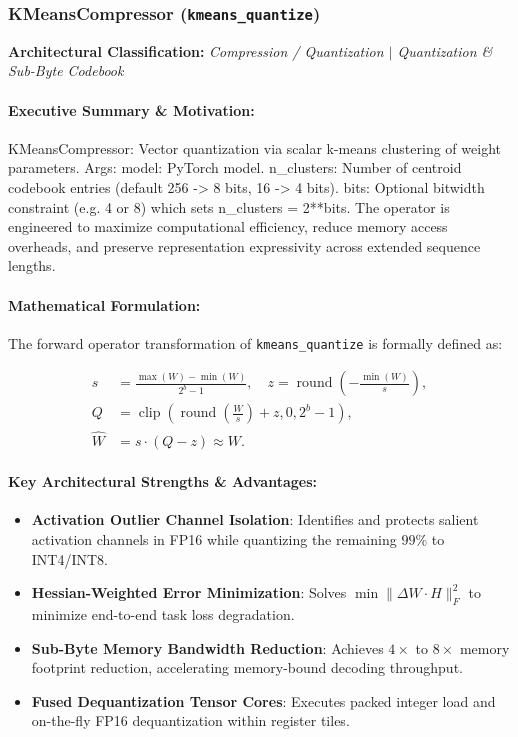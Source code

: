 \subsubsection{KMeansCompressor (\texttt{kmeans\_quantize})}
\label{sec:module_kmeans\_quantize}

\textbf{Architectural Classification:} \textit{Compression / Quantization $\mid$ Quantization & Sub-Byte Codebook}

\paragraph{Executive Summary \& Motivation:}
KMeansCompressor: Vector quantization via scalar k-means clustering of weight parameters.  Args:     model: PyTorch model.     n\_clusters: Number of centroid codebook entries (default 256 -> 8 bits, 16 -> 4 bits).     bits: Optional bitwidth constraint (e.g. 4 or 8) which sets n\_clusters = 2**bits. The operator is engineered to maximize computational efficiency, reduce memory access overheads, and preserve representation expressivity across extended sequence lengths.

\paragraph{Mathematical Formulation:}
The forward operator transformation of \texttt{kmeans\_quantize} is formally defined as:

\begin{align}
s &= \frac{\max(W) - \min(W)}{2^b - 1}, \quad z = \operatorname{round}\left(-\frac{\min(W)}{s}\right), \\
Q &= \operatorname{clip}\left(\operatorname{round}\left(\frac{W}{s}\right) + z, 0, 2^b - 1\right), \\
\hat{W} &= s \cdot (Q - z) \approx W.
\end{align}


\paragraph{Key Architectural Strengths \& Advantages:}
\begin{itemize}
    \item \textbf{Activation Outlier Channel Isolation}: Identifies and protects salient activation channels in FP16 while quantizing the remaining $99\%$ to INT4/INT8.
    \item \textbf{Hessian-Weighted Error Minimization}: Solves $\min \|\Delta W \cdot H\|_F^2$ to minimize end-to-end task loss degradation.
    \item \textbf{Sub-Byte Memory Bandwidth Reduction}: Achieves $4\times$ to $8\times$ memory footprint reduction, accelerating memory-bound decoding throughput.
    \item \textbf{Fused Dequantization Tensor Cores}: Executes packed integer load and on-the-fly FP16 dequantization within register tiles.
\end{itemize}

